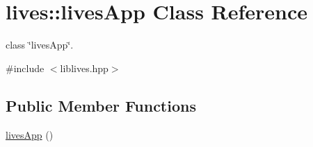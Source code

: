 \hypertarget{classlives_1_1livesApp}{\section{lives\-:\-:lives\-App Class Reference}
\label{classlives_1_1livesApp}
}


class \char`\"{}lives\-App\char`\"{}.  




{\ttfamily \#include $<$liblives.\-hpp$>$}

\subsection*{Public Member Functions}
\begin{DoxyCompactItemize}
\item 
\hypertarget{classlives_1_1livesApp_ab935870a052e1d8450397f28c3f93256}{\hyperlink{classlives_1_1livesApp_ab935870a052e1d8450397f28c3f93256}{lives\-App} ()}\label{classlives_1_1livesApp_ab935870a052e1d8450397f28c3f93256}


\end{DoxyCompactItemize}
